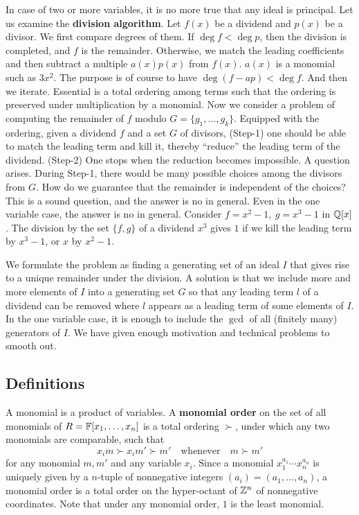 In case of two or more variables, it is no more true that any ideal is principal.
Let us examine the {\bf division algorithm}.
Let $f(x)$ be a dividend and $p(x)$ be a divisor.
We first compare degrees of them.
If $\deg f < \deg p$, then the division is completed, and $f$ is the remainder.
Otherwise, we match the leading coefficients and then subtract a multiple $a(x)p(x)$ from $f(x)$.
$a(x)$ is a monomial such as $3x^2$.
The purpose is of course to have $\deg (f-ap) < \deg f$.
And then we iterate.
Essential is a total ordering among terms such that the ordering is preserved under multiplication by a monomial.
Now we consider a problem of computing the remainder of $f$ modulo $G = \{ g_1, \ldots, g_k \}$.
Equipped with the ordering, given a dividend $f$ and a set $G$ of divisors,
(Step-1) one should be able to match the leading term and kill it,
thereby ``reduce'' the leading term of the dividend.
(Step-2) One stops when the reduction becomes impossible.
A question arises.
During Step-1, there would be many possible choices among the divisors from $G$.
How do we guarantee that the remainder is independent of the choices?
This is a sound question, and the answer is no in general.
Even in the one variable case, the answer is no in general.
Consider $f = x^2 -1,~ g = x^3 -1$ in $\mathbb{Q}[x]$.
The division by the set $\{f,g\}$ of a dividend $x^3$ gives $1$
if we kill the leading term by $x^3-1$,
or $x$ by $x^2-1$.

We formulate the problem as finding a generating set of an ideal $I$ 
that gives rise to a unique remainder under the division.
A solution is that we include more and more elements of $I$ into a generating set $G$
so that any leading term $l$ of a dividend can be removed 
where $l$ appears as a leading term of some elements of $I$.
In the one variable case, it is enough to include the $\gcd$ of all (finitely many) generators of $I$.
We have given enough motivation and technical problems to smooth out.

\subsection*{Definitions}

A monomial is a product of variables.
A {\bf monomial order} on the set of all monomials of $R = \mathbb{F}[x_1,\ldots,x_n]$
is a total ordering $\succ$, under which any two monomials are comparable, such that
\begin{equation}
 x_i m \succ x_i m' \succ m' \quad \text{whenever} \quad m \succ m'
 \label{cond-TermOrder}
\end{equation}
for any monomial $m,m'$ and any variable $x_i$.
Since a monomial $x_1^{a_1} \cdots x_n^{a_n}$ is uniquely given by a $n$-tuple of nonnegative integers $(a_i) = (a_1,\ldots,a_n)$,
a monomial order is a total order on the hyper-octant of $\mathbb{Z}^n$ of nonnegative coordinates.
Note that under any monomial order, $1$ is the least monomial.

